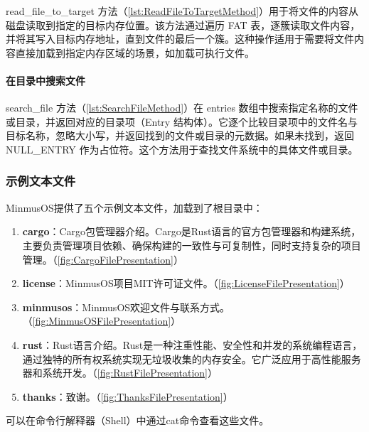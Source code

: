 read\_file\_to\_target 方法（\cref{lst:ReadFileToTargetMethod}）用于将文件的内容从磁盘读取到指定的目标内存位置。该方法通过遍历 FAT 表，逐簇读取文件内容，并将其写入目标内存地址，直到文件的最后一个簇。这种操作适用于需要将文件内容直接加载到指定内存区域的场景，如加载可执行文件。

\paragraph{在目录中搜索文件}

search\_file 方法（\cref{lst:SearchFileMethod}）在 entries 数组中搜索指定名称的文件或目录，并返回对应的目录项（Entry 结构体）。它逐个比较目录项中的文件名与目标名称，忽略大小写，并返回找到的文件或目录的元数据。如果未找到，返回 NULL\_ENTRY 作为占位符。这个方法用于查找文件系统中的具体文件或目录。

\subsubsection{示例文本文件}

MinmusOS提供了五个示例文本文件，加载到了根目录中：

\begin{enumerate}
    \item \textbf{cargo}：Cargo包管理器介绍。Cargo是Rust语言的官方包管理器和构建系统，主要负责管理项目依赖、确保构建的一致性与可复制性，同时支持复杂的项目管理。（\cref{fig:CargoFilePresentation}）
    \item \textbf{license}：MinmusOS项目MIT许可证文件。（\cref{fig:LicenseFilePresentation}）
    \item \textbf{minmusos}：MinmusOS欢迎文件与联系方式。（\cref{fig:MinmusOSFilePresentation}）
    \item \textbf{rust}：Rust语言介绍。Rust是一种注重性能、安全性和并发的系统编程语言，通过独特的所有权系统实现无垃圾收集的内存安全。它广泛应用于高性能服务器和系统开发。（\cref{fig:RustFilePresentation}）
    \item \textbf{thanks}：致谢。（\cref{fig:ThanksFilePresentation}）
\end{enumerate}

可以在命令行解释器（Shell）中通过cat命令查看这些文件。

